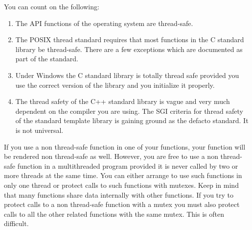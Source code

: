 You can count on the following:

\begin{enumerate}

\item The API functions of the operating system are thread-safe.

\item The POSIX thread standard requires that most functions in the C standard library be
  thread-safe. There are a few exceptions which are documented as part of the standard.

\item Under Windows the C standard library is totally thread safe provided you use the correct
  version of the library and you initialize it properly.

\item The thread safety of the C++ standard library is vague and very much dependent on the
  compiler you are using. The SGI criteria for thread safety of the standard template library is
  gaining ground as the defacto standard. It is not universal.

\end{enumerate}

If you use a non thread-safe function in one of your functions, your function will be rendered
non thread-safe as well. However, you are free to use a non thread-safe function in a
multithreaded program provided it is never called by two or more threads at the same time. You
can either arrange to use such functions in only one thread or protect calls to such functions
with mutexes. Keep in mind that many functions share data internally with other functions. If
you try to protect calls to a non thread-safe function with a mutex you must also protect calls
to all the other related functions with the same mutex. This is often difficult.
